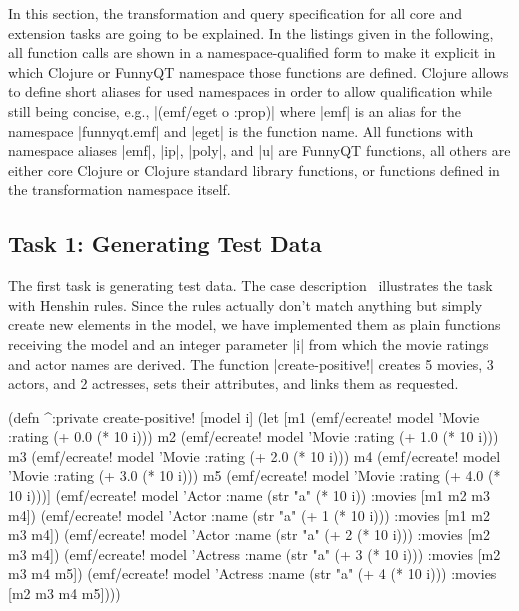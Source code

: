 \documentclass[submission]{eptcs}
\newcommand{\code}{\clojureinline}
\begin{document}
In this section, the transformation and query specification for all core and
extension tasks are going to be explained.  In the listings given in the
following, all function calls are shown in a namespace-qualified form to make
it explicit in which Clojure or FunnyQT namespace those functions are defined.
Clojure allows to define short aliases for used namespaces in order to allow
qualification while still being concise, e.g., \code|(emf/eget o :prop)| where
\code|emf| is an alias for the namespace \code|funnyqt.emf| and \code|eget| is
the function name.  All functions with namespace aliases \code|emf|, \code|ip|,
\code|poly|, and \code|u| are FunnyQT functions, all others are either core
Clojure or Clojure standard library functions, or functions defined in the
transformation namespace itself.


\subsection{Task 1: Generating Test Data}
\label{sec:task-1:generating-test-data}

The first task is generating test data.  The case
description~\cite{movies-case-desc} illustrates the task with Henshin rules.
Since the rules actually don't match anything but simply create new elements in
the model, we have implemented them as plain functions receiving the model and
an integer parameter \code|i| from which the movie ratings and actor names are
derived.  The function \code|create-positive!| creates 5 movies, 3 actors, and
2 actresses, sets their attributes, and links them as requested.

\begin{clojurecode}
(defn ^:private create-positive! [model i]
  (let [m1 (emf/ecreate! model 'Movie {:rating (+ 0.0 (* 10 i))})
        m2 (emf/ecreate! model 'Movie {:rating (+ 1.0 (* 10 i))})
        m3 (emf/ecreate! model 'Movie {:rating (+ 2.0 (* 10 i))})
        m4 (emf/ecreate! model 'Movie {:rating (+ 3.0 (* 10 i))})
        m5 (emf/ecreate! model 'Movie {:rating (+ 4.0 (* 10 i))})]
    (emf/ecreate! model 'Actor   {:name (str "a" (* 10 i))       :movies [m1 m2 m3 m4]})
    (emf/ecreate! model 'Actor   {:name (str "a" (+ 1 (* 10 i))) :movies [m1 m2 m3 m4]})
    (emf/ecreate! model 'Actor   {:name (str "a" (+ 2 (* 10 i))) :movies [m2 m3 m4]})
    (emf/ecreate! model 'Actress {:name (str "a" (+ 3 (* 10 i))) :movies [m2 m3 m4 m5]})
    (emf/ecreate! model 'Actress {:name (str "a" (+ 4 (* 10 i))) :movies [m2 m3 m4 m5]})))
\end{clojurecode}
\end{document}
